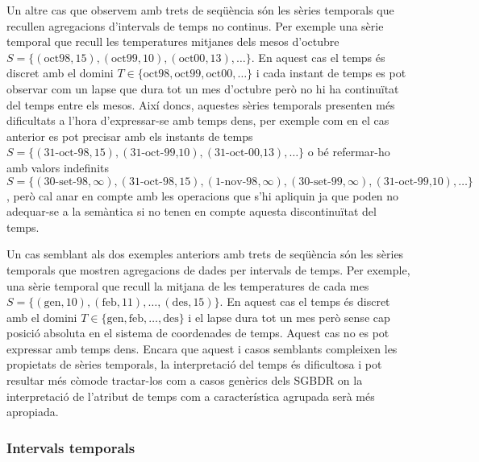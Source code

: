 \begin{example} 
  Un altre cas que observem amb trets de seqüència són les sèries
  temporals que recullen agregacions d'intervals de temps no continus.
  Per exemple una sèrie temporal que recull les temperatures mitjanes
  dels mesos d'octubre
  $S=\{(\text{oct98},15),(\text{oct99},10),(\text{oct00},13),\dotsc\}$.
  En aquest cas el temps és discret amb el domini
  $T\in\{\text{oct98},\text{oct99},\text{oct00},\dotsc\}$ i cada
  instant de temps es pot observar com un lapse que dura tot un mes
  d'octubre però no hi ha continuïtat del temps entre els mesos. Així
  doncs, aquestes sèries temporals presenten més dificultats a l'hora
  d'expressar-se amb temps dens, per exemple com en el cas anterior es
  pot precisar amb els instants de temps
  $S=\{(\text{31-oct-98},15),(\text{31-oct-99,10}),(\text{31-oct-00,13}),\dotsc\}$
  o bé refermar-ho amb valors indefinits
  $S=\{(\text{30-set-98},\infty),(\text{31-oct-98},15),(\text{1-nov-98},\infty),(\text{30-set-99},\infty),(\text{31-oct-99,10}),\dotsc\}$,
  però cal anar en compte amb les operacions que s'hi apliquin ja que
  poden no adequar-se a la semàntica si no tenen en compte aquesta
  discontinuïtat del temps.
\end{example}


\begin{example}
  Un cas semblant als dos exemples anteriors amb trets de seqüència
  són les sèries temporals que mostren agregacions de dades per
  intervals de temps. Per exemple, una sèrie temporal que recull la
  mitjana de les temperatures de cada mes
  $S=\{(\text{gen},10),(\text{feb},11),\dotsc,(\text{des},15)\}$. En
  aquest cas el temps és discret amb el domini
  $T\in\{\text{gen},\text{feb},\dotsc,\text{des}\}$ i el lapse dura
  tot un mes però sense cap posició absoluta en el sistema de
  coordenades de temps. Aquest cas no es pot expressar amb temps dens.
  Encara que aquest i casos semblants compleixen les propietats de
  sèries temporals, la interpretació del temps és dificultosa i pot
  resultar més còmode tractar-los com a casos genèrics dels
  \gls{SGBDR} on la interpretació de l'atribut de temps com a
  característica agrupada serà més apropiada.
\end{example}




\subsubsection{Intervals temporals}


